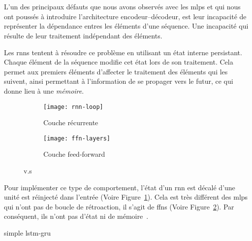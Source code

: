 \section{}
\label{sec.rnn}

L'un des principaux défauts que nous avons observés avec les \glspl{mlp} 
et qui nous ont poussés à introduire l'architecture encodeur--décodeur,
est leur incapacité de représenter la dépendance entres les éléments d'une séquence.
Une incapacité qui résulte de leur traitement indépendant des éléments.

Les \glspl{rnn} tentent à résoudre ce problème en utilisant un état interne persistant.
Chaque élément de la séquence modifie cet état lors de son traitement.
Cela permet aux premiers éléments d'affecter le traitement des éléments qui les suivent, 
ainsi permettant à l'information de se propager vers le futur,
ce qui donne lieu à une \emph{mémoire}.
\begin{figure}[hbt]
    \begin{center}
        \begin{subfigure}{.4\linewidth}
            \texttt{[image: rnn-loop]}
            \caption{Couche récurrente}
            \label{fig.rnn-loop}
        \end{subfigure}
        \begin{subfigure}{.4\linewidth}
            \texttt{[image: ffn-layers]}
            \caption{Couche feed-forward}
            \label{fig.ffn-layer}
        \end{subfigure}
    \end{center}
    \caption{ v.s }
    \label{fig.rnn-vs-ffn}
\end{figure}
Pour implémenter ce type de comportement, 
l'état d'un \gls{rnn} est décalé d'une unité est réinjecté dans l'entrée (Voire Figure~\ref{fig.rnn-loop}).
Cela est très différent des \glspl{mlp} qui n'ont pas de boucle de rétroaction,
il s'agit de \glspl{ffn} (Voire Figure~\ref{fig.ffn-layer}).
Par conséquent, ils n'ont pas d'état ni de mémoire~\cite{Fathi_2021}.


{simple}
{lstm-gru}
